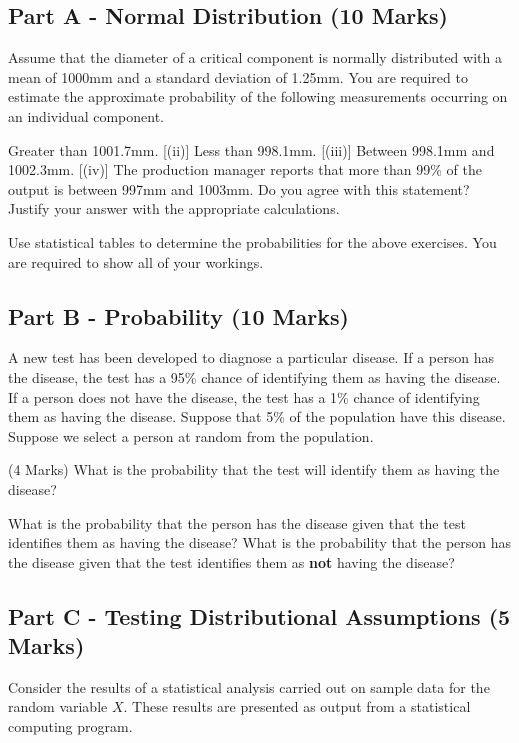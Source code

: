 \subsection*{Part A - Normal Distribution (10 Marks)}

\smallskip	
\noindent Assume that the diameter of a critical component is normally distributed with a mean of 1000mm and a standard deviation of 1.25mm. You are required  to estimate the approximate probability of the following measurements occurring on an individual component.
\begin{itemize}
[(i)] Greater than 1001.7mm.
[(ii)] Less than 998.1mm.
 [(iii)] Between 998.1mm and 1002.3mm.
[(iv)]  The production manager reports that more than 99\% of the output is between 997mm and 1003mm. Do you agree with this statement? Justify your answer with the appropriate calculations.
\end{itemize}
\medskip
\noindent Use statistical tables to determine the probabilities for the above exercises. You are required to show all of your workings.

\bigskip
\subsection*{Part B - Probability (10 Marks)} %
A new test has been developed to diagnose a particular disease. If a person has the disease, the test has a 95\% chance of identifying them as having the disease.
If a person does not have the disease, the test has a 1\% chance of identifying them as having the disease.  Suppose that 5\% of the population have this disease. Suppose we select a person at random from the population.


\begin{enumerate}[(i)]
 (4 Marks) What is the probability that the test will identify them as having the disease?
	
  What is the probability that the person has the disease given that the test identifies them as having the disease?
  What is the probability that the person has the disease given that the test identifies them as \textbf{not} having the disease?
\end{enumerate}

\subsection*{Part C - Testing Distributional Assumptions (5 Marks)}
Consider the results of a statistical analysis carried out on sample data for the random variable $X$. These results are presented as output from a statistical computing program.

